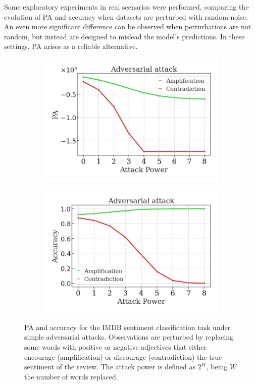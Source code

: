 Some exploratory experiments in real scenarios were performed, comparing
the evolution of PA and accuracy when datasets are perturbed with random noise. 
An even more significant difference can be observed when perturbations are not
random, but instead are designed to mislead the model's predictions. In these
settings, PA arises as a reliable alternative. \\

\begin{figure}[H]
    \centering
    \begin{subfigure}[b]{0.45\textwidth}
        \centering
        \includegraphics[width=\textwidth]{img/results_discussion/empirical/adversarial_logPA.png}
    \end{subfigure}
    \hfill
    \begin{subfigure}[b]{0.45\textwidth}
        \centering
        \includegraphics[width=\textwidth]{img/results_discussion/empirical/adversarial_AFR_true.png}
    \end{subfigure}
    \caption{
    PA and accuracy for the IMDB sentiment classification 
    task under simple adversarial attacks. Observations are perturbed by replacing
    some words with positive or negative adjectives that either encourage (amplification)
    or discourage (contradiction) the true sentiment of the review.
    The attack power is defined as $2^W$, being $W$ the number of words replaced.
    }
    \label{fig:imdb_adversarial}
\end{figure}

